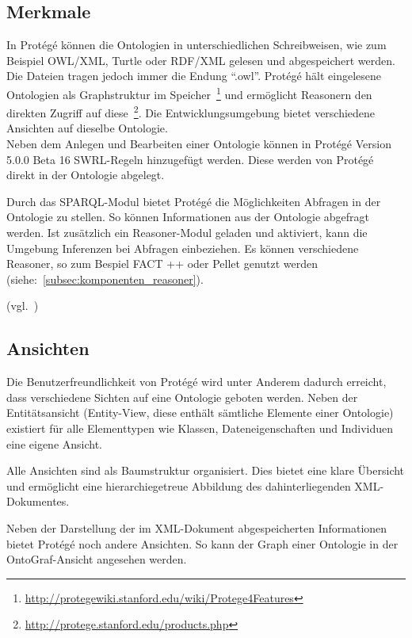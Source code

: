 \subsection{Merkmale}
\label{subsec:komponenten_protege_features}
In Protégé können die Ontologien in unterschiedlichen Schreibweisen, wie zum Beispiel OWL/XML, Turtle oder RDF/XML gelesen und abgespeichert werden. Die Dateien tragen jedoch immer die Endung ``.owl''. Protégé hält eingelesene Ontologien als Graphstruktur im Speicher~\footnote{\url{http://protegewiki.stanford.edu/wiki/Protege4Features}} und ermöglicht Reasonern den direkten Zugriff auf diese~\footnote{\url{http://protege.stanford.edu/products.php}}. Die Entwicklungsumgebung bietet verschiedene Ansichten auf dieselbe Ontologie. \\
Neben dem Anlegen und Bearbeiten einer Ontologie können in Protégé Version 5.0.0 Beta 16 SWRL-Regeln hinzugefügt werden. Diese werden von Protégé direkt in der Ontologie abgelegt. 

Durch das SPARQL-Modul bietet Protégé die Möglichkeiten Abfragen in der Ontologie zu stellen. So können Informationen aus der Ontologie abgefragt werden. Ist zusätzlich ein Reasoner-Modul geladen und aktiviert, kann die Umgebung Inferenzen bei Abfragen einbeziehen. Es können verschiedene Reasoner, so zum Bespiel FACT ++ oder Pellet genutzt werden (siehe:~\ref{subsec:komponenten_reasoner}).

(vgl.~\cite{protegeFeatures})

\subsection{Ansichten}
\label{subsec:komponenten_protege_view}

Die Benutzerfreundlichkeit von Protégé wird unter Anderem dadurch erreicht, dass verschiedene Sichten auf eine Ontologie geboten werden. Neben der Entitätsansicht (Entity-View, diese enthält sämtliche Elemente einer Ontologie) existiert für alle Elementtypen wie Klassen, Dateneigenschaften und Individuen eine eigene Ansicht.

Alle Ansichten sind als Baumstruktur organisiert. Dies bietet eine klare Übersicht und ermöglicht eine hierarchiegetreue Abbildung des dahinterliegenden XML-Dokumentes.

Neben der Darstellung der im XML-Dokument abgespeicherten Informationen bietet Protégé noch andere Ansichten. So kann der Graph einer Ontologie in der OntoGraf-Ansicht angesehen werden.~\cite{protegeView}


